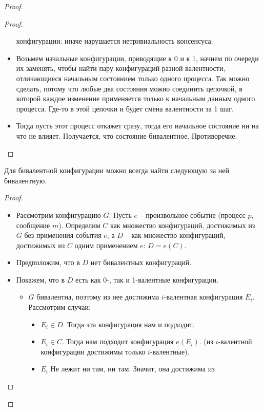 \begin{proof}
\begin{proof}
\begin{itemize}
                конфигурации: иначе нарушается нетривиальность консенсуса.
            \item Возьмем начальные конфигурации, приводящие к 0 и к 1, начнем
                по очереди их заменять, чтобы найти пару конфигураций разной валентности,
                отличающиеся начальным состоянием только одного процесса. Так можно сделать,
                потому что любые два состояния можно соединить цепочкой, в которой каждое
                изменение применяется только к начальным данным одного процесса. Где-то
                в этой цепочки и будет смена валентности за 1 шаг.
            \item Тогда пусть этот процесс откажет сразу, тогда его начальное состояние
                ни на что не влияет. Получается, что состояние бивалентное. Противоречие.
        \end{itemize}
    \end{proof}
    \begin{lemma}
        Для бивалентной конфигурации можно всегда найти следующую за ней бивалентную.
    \end{lemma}
    \begin{proof} 
        \enewline
        \begin{itemize}
            \item Рассмотрим конфигурацию $G$. Пусть $e$ -- произвольное событие (процесс $p$, сообщение $m$).
                Определим $C$ как множество конфигураций, достижимых из $G$ без применения
                события $e$, а $D$ -- как множество конфигураций, достижимых из $C$
                одним применением $e$: $D = e(C)$.
            \item Предположим, что в $D$ нет бивалентных конфигураций.
            \item Покажем, что в $D$ есть как 0-, так и 1-валентные конфигурации.
                \begin{itemize}
                    \item $G$ бивалентна, поэтому из нее достижима $i$-валентная
                        конфигурация $E_i$. Рассмотрим случаи:
                        \begin{itemize}
                            \item $E_i \in D$. Тогда эта конфигурация нам и подходит.
                            \item $E_i \in C$. Тогда нам подходит конфигурация $e(E_i)$.
                                (из $i$-валентной конфигурации достижимы только $i$-валентные).
                            \item $E_i$ Не лежит ни там, ни там. Значит, она достижима из

\end{itemize}
\end{itemize}
\end{itemize}
\end{proof}
\end{proof}
